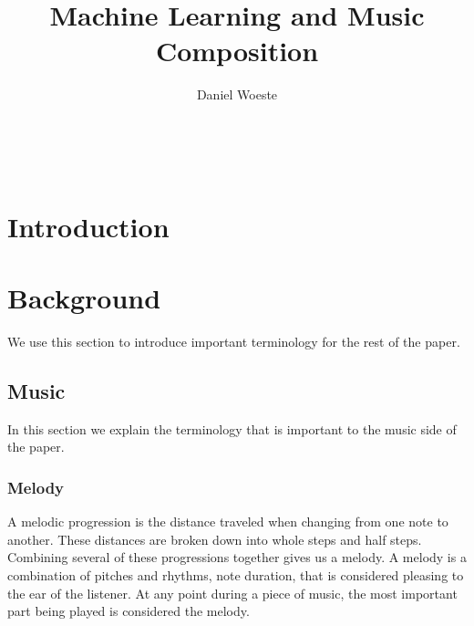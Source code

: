 \documentclass{sig-alternate}
\begin{document}

\title{Machine Learning and Music Composition}
\author{
\alignauthor
Daniel Woeste\\
	\\
	\\
	\\
}


\maketitle
\begin{abstract}

\end{abstract}

\section{Introduction}
\label{sec:introduction}

\section{Background}
\label{sec:background}
	We use this section to introduce important terminology for the rest of the paper.

\subsection{Music}
\label{sec:music}
	In this section we explain the terminology that is important to the music side of the paper.
\subsubsection{Melody}
\label{sec:melody}
A melodic progression is the distance traveled when changing from one note to another. These distances are broken down into whole steps and half steps. Combining several of these progressions together gives us a melody. A melody is a combination of pitches and rhythms, note duration, that is considered pleasing to the ear of the listener. At any point during a piece of music, the most important part being played is considered the melody. 
\end{document}
